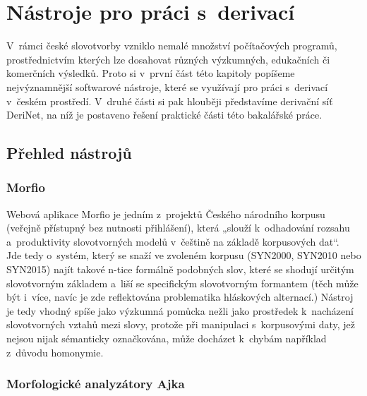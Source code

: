 \hypertarget{nuxe1stroje-pro-pruxe1ci-s-derivacuxed}{%
\chapter{Nástroje pro práci
s~derivací}\label{nuxe1stroje-pro-pruxe1ci-s-derivacuxed}}

V~rámci české slovotvorby vzniklo nemalé množství počítačových programů,
prostřednictvím kterých lze dosahovat různých výzkumných, edukačních či
komerčních výsledků. Proto si v~první část této kapitoly popíšeme
nejvýznamnější softwarové nástroje, které se využívají pro práci
s~derivací v~českém prostředí. V~druhé části si pak hlouběji představíme
derivační síť DeriNet, na níž je postaveno řešení praktické části této
bakalářské práce.

\hypertarget{pux159ehled-nuxe1strojux16f}{%
\section{Přehled nástrojů}\label{pux159ehled-nuxe1strojux16f}}

\hypertarget{morfio}{%
\subsection{Morfio}\label{morfio}}

Webová aplikace Morfio je jedním z~projektů Českého národního korpusu
(veřejně přístupný bez nutnosti přihlášení), která „slouží k~odhadování
rozsahu a~produktivity slovotvorných modelů v~češtině na základě
korpusových dat``.~\parencite{cvrcek13} Jde tedy o~systém, který se
snaží ve zvoleném korpusu (SYN2000, SYN2010 nebo SYN2015) najít takové
n-tice formálně podobných slov, které se shodují určitým slovotvorným
základem a~liší se specifickým slovotvorným formantem (těch může být
i~více, navíc je zde reflektována problematika hláskových alternací.)
Nástroj je tedy vhodný spíše jako výzkumná pomůcka nežli jako prostředek
k~nacházení slovotvorných vztahů mezi slovy, protože při manipulaci
s~korpusovými daty, jež nejsou nijak sémanticky označkována, může docházet
k~chybám například z~důvodu homonymie.~\parencite{cvrcek13}

\hypertarget{morfologickuxe9-analyzuxe1tory-ajka}{%
\subsection{Morfologické analyzátory
Ajka}\label{morfologickuxe9-analyzuxe1tory-ajka}}

